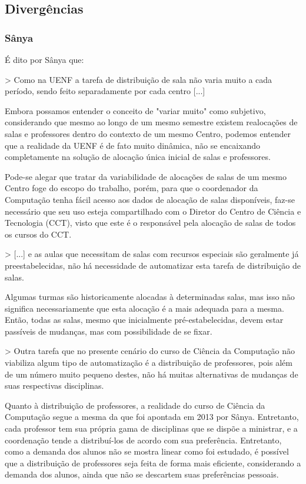     \subsection{Divergências} %

        \subsubsection{Sânya} %

            É dito por Sânya que:

            > Como na UENF a tarefa de distribuição de sala não varia muito a cada período, sendo feito separadamente por cada centro [...]

            Embora possamos entender o conceito de "variar muito" como subjetivo, considerando que mesmo ao longo de um mesmo semestre existem realocações de salas e professores dentro do contexto de um mesmo Centro, podemos entender que a realidade da UENF é de fato muito dinâmica, não se encaixando completamente na solução de alocação única inicial de salas e professores.

            Pode-se alegar que tratar da variabilidade de alocações de salas de um mesmo Centro foge do escopo do trabalho, porém, para que o coordenador da Computação tenha fácil acesso aos dados de alocação de salas disponíveis, faz-se necessário que seu uso esteja compartilhado com o Diretor do Centro de Ciência e Tecnologia (CCT), visto que este é o responsável pela alocação de salas de todos os cursos do CCT.

            > [...] e as aulas que necessitam de salas com recursos especiais são geralmente já preestabelecidas, não há necessidade de automatizar esta tarefa de distribuição de salas.

            Algumas turmas são historicamente alocadas à determinadas salas, mas isso não significa necessariamente que esta alocação é a mais adequada para a mesma. Então, todas as salas, mesmo que inicialmente pré-estabelecidas, devem estar passíveis de mudanças, mas com possibilidade de se fixar.

            > Outra tarefa que no presente cenário do curso de Ciência da Computação não viabiliza algum tipo de automatização é a distribuição de professores, pois além de um número muito pequeno destes, não há muitas alternativas de mudanças de suas respectivas disciplinas.

            Quanto à distribuição de professores, a realidade do curso de Ciência da Computação segue a mesma da que foi apontada em 2013 por Sânya. Entretanto, cada professor tem sua própria gama de disciplinas que se dispõe a ministrar, e a coordenação tende a distribuí-los de acordo com sua preferência. Entretanto, como a demanda dos alunos não se mostra linear como foi estudado, é possível que a distribuição de professores seja feita de forma mais eficiente, considerando a demanda dos alunos, ainda que não se descartem suas preferências pessoais.

